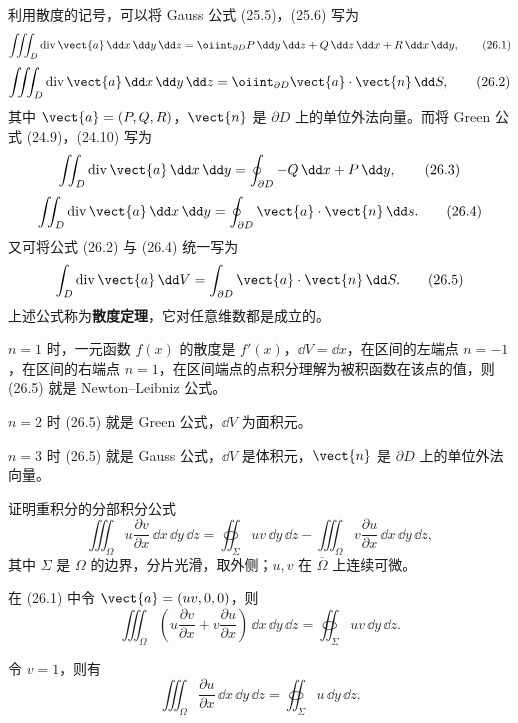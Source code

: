 利用散度的记号，可以将 Gauss 公式 (25.5)，(25.6) 写为
\begin{equation}
  \iiint_D \operatorname{div}\vect{a}\,\dd x\,\dd y\,\dd z
  =\oiint_{\partial D} P\,\dd y\,\dd z+Q\,\dd z\,\dd x+R\,\dd x\,\dd y,
  \tag{26.1}
  \label{eq:26.1}
\end{equation}
\begin{equation}
  \iiint_D \operatorname{div}\vect{a}\,\dd x\,\dd y\,\dd z
  =\oiint_{\partial D}\vect{a}\cdot\vect{n}\,\dd S,
  \tag{26.2}
  \label{eq:26.2}
\end{equation}
其中 $\vect{a}=(P,Q,R)$，$\vect{n}$ 是 $\partial D$ 上的单位外法向量。而将 Green 公式 (24.9)，(24.10) 写为
\begin{equation}
  \iint_D \operatorname{div}\vect{a}\,\dd x\,\dd y
  =\oint_{\partial D}-Q\,\dd x+P\,\dd y,
  \tag{26.3}
  \label{eq:26.3}
\end{equation}
\begin{equation}
  \iint_D \operatorname{div}\vect{a}\,\dd x\,\dd y
  =\oint_{\partial D}\vect{a}\cdot\vect{n}\,\dd s.
  \tag{26.4}
  \label{eq:26.4}
\end{equation}
又可将公式 (26.2) 与 (26.4) 统一写为
\begin{equation}
  \int_D \operatorname{div}\vect{a}\,\dd V
  =\int_{\partial D}\vect{a}\cdot\vect{n}\,\dd S.
  \tag{26.5}
  \label{eq:26.5}
\end{equation}
上述公式称为\textbf{散度定理}，它对任意维数都是成立的。

$n=1$ 时，一元函数 $f(x)$ 的散度是 $f'(x)$，$\dd V=\dd x$，在区间的左端点 $n=-1$，在区间的右端点 $n=1$，在区间端点的点积分理解为被积函数在该点的值，则 (26.5) 就是 Newton--Leibniz 公式。

$n=2$ 时 (26.5) 就是 Green 公式，$\dd V$ 为面积元。

$n=3$ 时 (26.5) 就是 Gauss 公式，$\dd V$ 是体积元，$\vect{n}$ 是 $\partial D$ 上的单位外法向量。

\begin{xexample}[26.1.1]
证明重积分的分部积分公式
\[
  \iiint_\Omega u\frac{\partial v}{\partial x}\,\dd x\,\dd y\,\dd z
  =\oiint_\Sigma uv\,\dd y\,\dd z
  -\iiint_\Omega v\frac{\partial u}{\partial x}\,\dd x\,\dd y\,\dd z,
\]
其中 $\Sigma$ 是 $\Omega$ 的边界，分片光滑，取外侧；$u,v$ 在 $\overline\Omega$ 上连续可微。
\end{xexample}
\begin{xproof}
在 (26.1) 中令 $\vect{a}=(uv,0,0)$，则
\[
  \iiint_\Omega\left(u\frac{\partial v}{\partial x}+v\frac{\partial u}{\partial x}\right)\,\dd x\,\dd y\,\dd z
  =\oiint_\Sigma uv\,\dd y\,\dd z.
\]
\end{xproof}
\begin{xremark}
令 $v=1$，则有
\[
  \iiint_\Omega\frac{\partial u}{\partial x}\,\dd x\,\dd y\,\dd z
  =\oiint_\Sigma u\,\dd y\,\dd z.
\]
\end{xremark}

